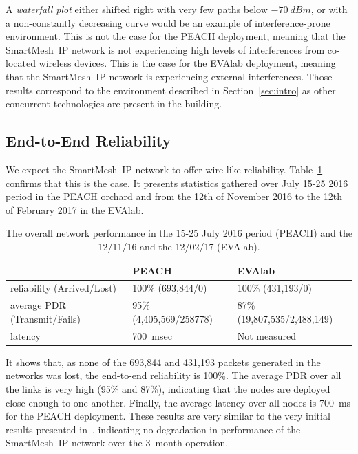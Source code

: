 \documentclass{elsarticle}
\newcommand{\smip}                {SmartMesh~IP\xspace}
\newcommand{\PEACHNUMPCKTS}       {693,844\xspace}
\newcommand{\EVANUMPCKTS}         {431,193\xspace}
\begin{document}
A \textit{waterfall plot} either shifted right with very few paths below $-70~dBm$, or with a non-constantly decreasing curve would be an example of interference-prone environment.
This is not the case for the PEACH deployment, meaning that the \smip network is not experiencing high levels of interferences from co-located wireless devices.
This is the case for the EVAlab deployment, meaning that the \smip network is experiencing external interferences.
Those results correspond to the environment described in Section~\ref{sec:intro} as other concurrent technologies are present in the building.

\subsection{End-to-End Reliability}
\label{sec:net_reliability}


We expect the \smip network to offer wire-like reliability.
Table~\ref{tab:net_stats} confirms that this is the case.
It presents statistics gathered over July 15-25 2016 period in the PEACH orchard and from the 12th of November 2016 to the 12th of February 2017 in the EVAlab.

\begin{table}
    \begin{tabular}{|l|l|l|}
        \toprule
        {}                              & PEACH                     & EVAlab \\
        \midrule
        reliability (Arrived/Lost)      & 100\% (\PEACHNUMPCKTS/0)  & 100\% (\EVANUMPCKTS/0)\\ \hline
        average PDR (Transmit/Fails)    & 95\% (4,405,569/258778)   & 87\% (19,807,535/2,488,149)\\ \hline
        latency                         & 700~msec                  & Not measured\\
        \bottomrule
    \end{tabular}
    \caption{The overall network performance in the 15-25 July 2016 period (PEACH) and the 12/11/16 and the 12/02/17 (EVAlab).}
    \label{tab:net_stats}
\end{table}

It shows that, as none of the \PEACHNUMPCKTS and \EVANUMPCKTS packets generated in the networks was lost, the end-to-end reliability is 100\%.
The average PDR over all the links is very high (95\% and 87\%), indicating that the nodes are deployed close enough to one another.
Finally, the average latency over all nodes is 700~ms for the PEACH deployment.
These results are very similar to the very initial results presented in~\cite{watteyne16peach}, indicating no degradation in performance of the \smip network over the 3~month operation.
\end{document}
